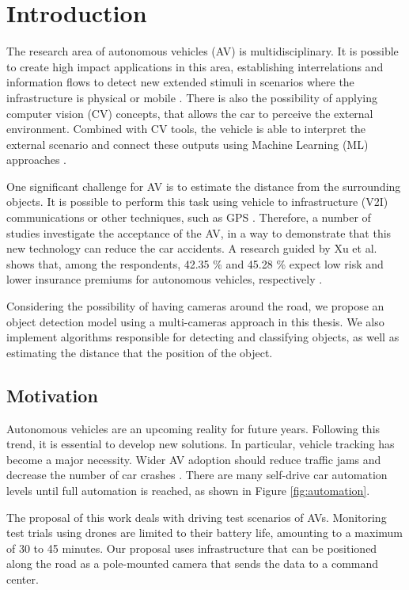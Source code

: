 \chapter{Introduction} \label{introducao}
The research area of autonomous vehicles (AV) is multidisciplinary. It is possible to create high impact applications in this area, establishing interrelations and information flows to detect new extended stimuli in scenarios where the infrastructure is physical or mobile \cite{bayat2017environmental}. There is also the possibility of applying computer vision (CV) concepts, that allows the car to perceive the external environment. Combined with CV tools, the vehicle is able to interpret the external scenario and connect these outputs using Machine Learning (ML) approaches \cite{rasouli2019autonomous}.

One significant challenge for AV is to estimate the distance from the surrounding objects. It is possible to perform this task using vehicle to infrastructure (V2I) communications or other techniques, such as GPS \cite{hobert2015enhancements}. Therefore, a number of studies investigate the acceptance of the AV, in a way to demonstrate that this new technology can reduce the car accidents. A research guided by Xu et al. shows that, among the respondents, 42.35 \% and 45.28 \% expect low risk and lower insurance premiums for autonomous vehicles, respectively \cite{xu2019autonomous}.

Considering the possibility of having cameras around the road, we propose an object detection model using a multi-cameras approach in this thesis. We also implement algorithms responsible for detecting and classifying objects, as well as estimating the distance that the position of the object.

\section{Motivation}

Autonomous vehicles are an upcoming reality for future years. Following this trend, it is essential to develop new solutions. In particular, vehicle tracking has become a major necessity. Wider AV adoption should reduce traffic jams and decrease the number of car crashes \cite{bonnefon2016social}. There are many self-drive car automation levels until full automation is reached, as shown in Figure \ref{fig:automation}. 

The proposal of this work deals with driving test scenarios of AVs. Monitoring test trials using drones are limited to their battery life, amounting to a maximum of 30 to 45 minutes. Our proposal uses infrastructure that can be positioned along the road as a pole-mounted camera that sends the data to a command center.

